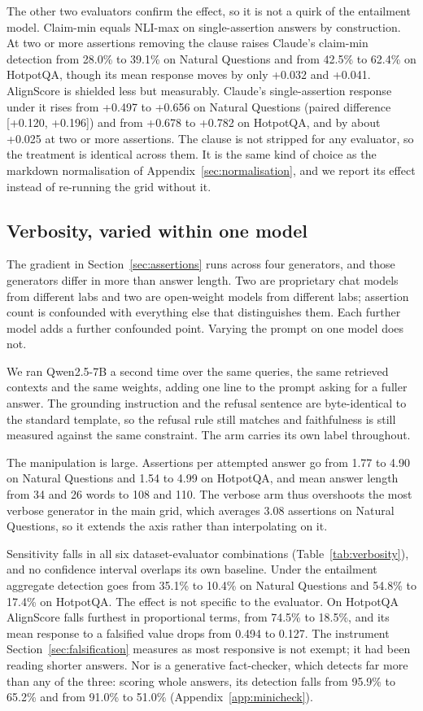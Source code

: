 \documentclass[11pt]{article}
\newcommand{\movedref}{Appendix}            %
\newcommand{\movedref}{Section}
\begin{document}
The other two evaluators confirm the effect, so it is not a quirk of the entailment model. Claim-min equals NLI-max on single-assertion answers by construction. At two or more assertions removing the clause raises Claude's claim-min detection from 28.0\% to 39.1\% on Natural Questions and from 42.5\% to 62.4\% on HotpotQA, though its mean response moves by only +0.032 and +0.041. AlignScore is shielded less but measurably. Claude's single-assertion response under it rises from +0.497 to +0.656 on Natural Questions (paired difference [+0.120, +0.196]) and from +0.678 to +0.782 on HotpotQA, and by about +0.025 at two or more assertions. The clause is not stripped for any evaluator, so the treatment is identical across them. It is the same kind of choice as the markdown normalisation of \movedref~\ref{sec:normalisation}, and we report its effect instead of re-running the grid without it.



\subsection{Verbosity, varied within one model}
\label{sec:verbosity}

The gradient in Section~\ref{sec:assertions} runs across four generators, and those generators differ in more than answer length. Two are proprietary chat models from different labs and two are open-weight models from different labs; assertion count is confounded with everything else that distinguishes them. Each further model adds a further confounded point. Varying the prompt on one model does not.

We ran Qwen2.5-7B a second time over the same queries, the same retrieved contexts and the same weights, adding one line to the prompt asking for a fuller answer. The grounding instruction and the refusal sentence are byte-identical to the standard template, so the refusal rule still matches and faithfulness is still measured against the same constraint. The arm carries its own label throughout.

The manipulation is large. Assertions per attempted answer go from 1.77 to 4.90 on Natural Questions and 1.54 to 4.99 on HotpotQA, and mean answer length from 34 and 26 words to 108 and 110. The verbose arm thus overshoots the most verbose generator in the main grid, which averages 3.08 assertions on Natural Questions, so it extends the axis rather than interpolating on it.

Sensitivity falls in all six dataset-evaluator combinations (Table~\ref{tab:verbosity}), and no confidence interval overlaps its own baseline. Under the entailment aggregate detection goes from 35.1\% to 10.4\% on Natural Questions and 54.8\% to 17.4\% on HotpotQA. The effect is not specific to the evaluator. On HotpotQA AlignScore falls furthest in proportional terms, from 74.5\% to 18.5\%, and its mean response to a falsified value drops from 0.494 to 0.127. The instrument Section~\ref{sec:falsification} measures as most responsive is not exempt; it had been reading shorter answers. Nor is a generative fact-checker, which detects far more than any of the three: scoring whole answers, its detection falls from 95.9\% to 65.2\% and from 91.0\% to 51.0\% (Appendix~\ref{app:minicheck}).
\end{document}
